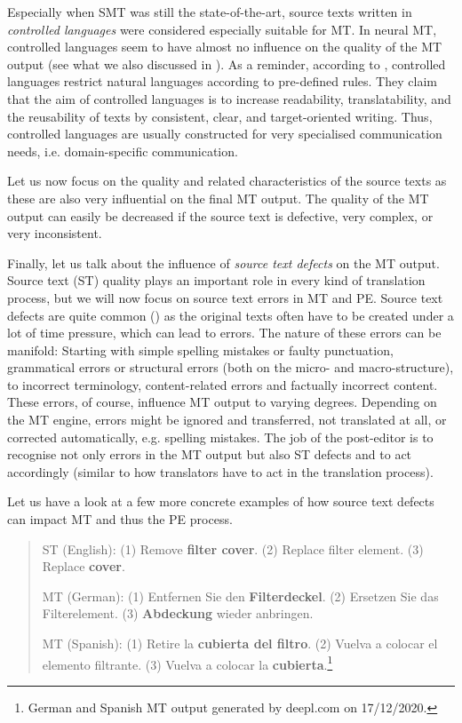 Especially when SMT was still the state-of-the-art, source texts written in \textit{controlled languages} were considered especially suitable for MT. In neural MT, controlled languages seem to have almost no influence on the quality of the MT output (see what we also discussed in ). As a reminder, according to \citet[39-41]{ferlein2008technische}, controlled languages restrict natural languages according to pre-defined rules. They claim that the aim of controlled languages is to increase readability, translatability, and the reusability of texts by consistent, clear, and target-oriented writing. Thus, controlled languages are usually constructed for very specialised communication needs, i.e. domain-specific communication. 

\bigskip

Let us now focus on the quality and related characteristics of the source texts as these are also very influential on the final MT output. The quality of the MT output can easily be decreased if the source text is defective, very complex, or very inconsistent.

Finally, let us talk about the influence of \textit{source text defects} on the MT output. Source text (ST) quality plays an important role in every kind of translation process, but we will now focus on source text errors in MT and PE. Source text defects are quite common (\citealt[162-210]{horn1999technisches}) as the original texts often have to be created under a lot of time pressure, which can lead to errors. The nature of these errors can be manifold: Starting with simple spelling mistakes or faulty punctuation, grammatical errors or structural errors (both on the micro- and macro-structure), to incorrect terminology, content-related errors and factually incorrect content. These errors, of course, influence MT output to varying degrees. Depending on the MT engine, errors might be ignored and transferred, not translated at all, or corrected automatically, e.g. spelling mistakes. The job of the post-editor is to recognise not only errors in the MT output but also ST defects and to act accordingly (similar to how translators have to act in the translation process).

Let us have a look at a few more concrete examples of how source text defects can impact MT and thus the PE process. 

\begin{quote}
ST (English): (1) Remove \textbf{filter cover}. (2) Replace filter element. (3) Replace \textbf{cover}.

MT (German): (1) Entfernen Sie den \textbf{Filterdeckel}. (2) Ersetzen Sie das Filterelement. (3) \textbf{Abdeckung} wieder anbringen.

MT (Spanish): (1) Retire la \textbf{cubierta del filtro}. (2) Vuelva a colocar el elemento filtrante. (3) Vuelva a colocar la \textbf{cubierta}.\footnote{German and Spanish MT output generated by deepl.com on 17/12/2020.}
\end{quote}

